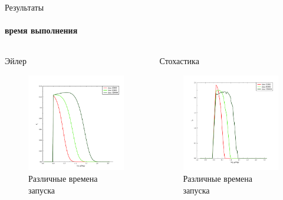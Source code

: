 \documentclass[8pt,pdf,hyperref={unicode},serif]{beamer}
\begin{document}
\begin{frame}{Результаты}
\framesubtitle{время выполнения}
\begin{columns}
\begin{column}{0.5\textwidth}
Эйлер
\begin{figure}[H]
\centering
\includegraphics[width=0.90\linewidth]{r_times}
\caption{Различные времена запуска}
\end{figure}
\end{column}

\begin{column}{0.5\textwidth}
Стохастика
\begin{figure}[H]
\centering
\includegraphics[width=0.90\linewidth]{stoh_times}
\caption{Различные времена запуска}
\end{figure}
\end{column}
\end{columns}
\end{frame}
\end{document}
